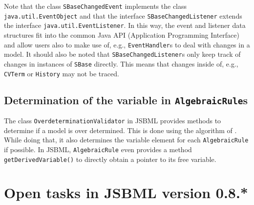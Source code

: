 \documentclass[
  BCOR12mm,
  letterpaper,
  11pt,
  headsepline,
  pointlessnumbers,
  tablecaptionabove,
  onelinecaption,
  headinclude,
  appendixprefix,
  idxtotoc,
  bibtotoc,
  twoside,
  titlepage
]{scrartcl}
\begin{document}
Note that the class \texttt{SBaseChangedEvent} implements the class
\texttt{java.util.EventObject} and that the interface
\texttt{SBaseChangedListener} extends the interface
\texttt{java.util.EventListener}. In this way, the event and listener data
structures fit into the common Java API (Application Programming Interface) and
allow users also to make use of, e.g., \texttt{EventHandler}s to deal with
changes in a model. It should also be noted that \texttt{SBaseChangedListener}s
only keep track of changes in instances of \texttt{SBase} directly. This means
that changes inside of, e.g., \texttt{CVTerm} or \texttt{History} may not be
traced.

\subsection{Determination of the variable in \texttt{AlgebraicRule}s}

The class \texttt{OverdeterminationValidator}
 in JSBML provides methods to
determine if a model
is over determined. This is done using the algorithm of \citet{Hopcroft1973}.
While doing that, it also determines the variable element for each
\texttt{AlgebraicRule} if
possible. In JSBML, \texttt{AlgebraicRule} even provides a method
\texttt{getDerivedVariable()} to directly obtain a pointer to its free variable.


% 

\section{Open tasks in JSBML version 0.8.*}
\end{document}
